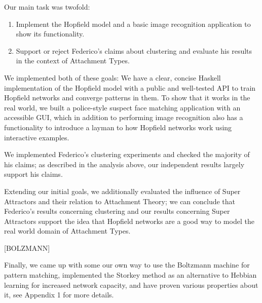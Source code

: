 Our main task was twofold:

\begin{enumerate}
\item Implement the Hopfield model and a basic image recognition application to show its functionality.
\item Support or reject Federico's claims about clustering and evaluate his results in the context of Attachment Types.
\end{enumerate}

We implemented both of these goals: We have a clear, concise Haskell implementation of the Hopfield model with a public and well-tested API to train Hopfield networks and converge patterns in them. To show that it works in the real world, we built a police-style suspect face matching application with an accessible GUI, which in addition to performing image recognition also has a functionality to introduce a layman to how Hopfield networks work using interactive examples.

We implemented Federico's clustering experiments and checked the majority of his claims; as described in the analysis above, our independent results largely support his claims.

Extending our initial goals, we additionally evaluated the influence of Super Attractors and their relation to Attachment Theory; we can conclude that Federico's results concerning clustering and our results concerning Super Attractors support the idea that Hopfield networks are a good way to model the real world domain of Attachment Types.

[BOLZMANN]

Finally, we came up with some our own way to use the Boltzmann machine for pattern matching, implemented the Storkey method as an alternative to Hebbian learning for increased network capacity, and have proven various properties about it, see Appendix 1 for more details.
